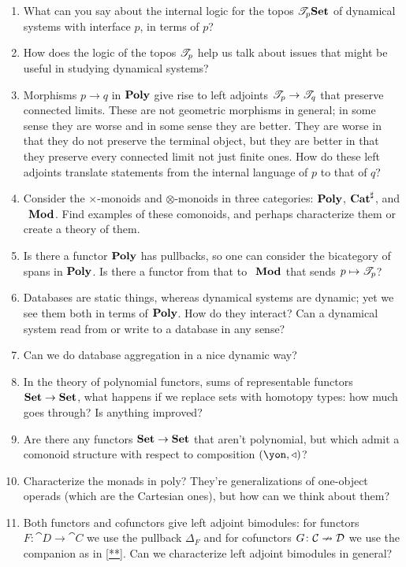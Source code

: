 \documentclass[DynamicalBook]{subfiles}
\begin{document}
\begin{enumerate}
  \item What can you say about the internal logic for the topos $\mathscr{T}_{p}\textbf{Set}$ of dynamical systems with interface $p$, in terms of $p$?
  \item How does the logic of the topos $\mathscr{T}_{p}$ help us talk about issues that might be useful in studying dynamical systems?
  \item Morphisms $p\to q$ in $\textbf{Poly}$ give rise to left adjoints $\mathscr{T}_{p}\to\mathscr{T}_{q}$ that preserve connected limits. These are not geometric morphisms in general; in some sense they are worse and in some sense they are better. They are worse in that they do not preserve the terminal object, but they are better in that they preserve every connected limit not just finite ones. How do these left adjoints translate statements from the internal language of $p$ to that of $q$?
  \item Consider the $\times$-monoids and $\otimes$-monoids in three categories: $\textbf{Poly}$, $\textbf{Cat}^\sharp$, and $~_{}\textbf{Mod}_{}$. Find examples of these comonoids, and perhaps characterize them or create a theory of them.
  \item Is there a functor $\textbf{Poly}$ has pullbacks, so one can consider the bicategory of spans in $\textbf{Poly}$. Is there a functor from that to $~_{}\textbf{Mod}_{}$ that sends $p\mapsto\mathscr{T}_{p}$?
  \item Databases are static things, whereas dynamical systems are dynamic; yet we see them both in terms of $\textbf{Poly}$. How do they interact? Can a dynamical system read from or write to a database in any sense?
  \item Can we do database aggregation in a nice dynamic way?
  \item In the theory of polynomial functors, sums of representable functors $\textbf{Set}\to\textbf{Set}$, what happens if we replace sets with homotopy types: how much goes through? Is anything improved?
  \item Are there any functors $\textbf{Set}\to\textbf{Set}$ that aren't polynomial, but which admit a comonoid structure with respect to composition $(\yon,\tri)$?
  \item Characterize the monads in poly? They're generalizations of one-object operads (which are the Cartesian ones), but how can we think about them?
  \item Both functors and cofunctors give left adjoint bimodules: for functors $F\colon\cat{D}\to\cat{C}$ we use the pullback $\Delta_F$ and for cofunctors $G\colon\mathcal{C}\nrightarrow\mathcal{D}$ we use the companion as in \cref{**}. Can we characterize left adjoint bimodules in general?

\end{enumerate}
\end{document}
